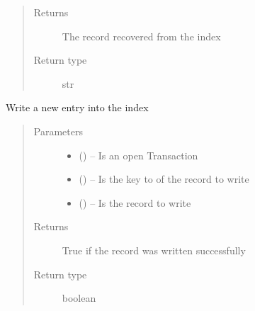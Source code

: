 \documentclass[letterpaper,10pt,english]{sphinxmanual}
\begin{document}
\begin{fulllineitems}
\begin{fulllineitems}
\begin{quote}
\begin{description}
\begin{itemize}
\end{itemize}

\item[{Returns}] \leavevmode
The record recovered from the index

\item[{Return type}] \leavevmode
str

\end{description}\end{quote}

\end{fulllineitems}


\begin{fulllineitems}
\label{\detokenize{index:mamba.Index.put}}
Write a new entry into the index
\begin{quote}\begin{description}
\item[{Parameters}] \leavevmode\begin{itemize}
\item {} 
 () -- Is an open Transaction

\item {} 
 () -- Is the key to of the record to write

\item {} 
 () -- Is the record to write

\end{itemize}

\item[{Returns}] \leavevmode
True if the record was written successfully

\item[{Return type}] \leavevmode
boolean

\end{description}\end{quote}

\end{fulllineitems}


\end{fulllineitems}

\end{document}
